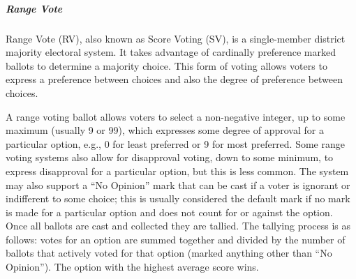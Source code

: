 %


\subparagraph{Range Vote}
Range Vote (RV), also known as Score Voting (SV), is a single-member district
majority electoral system. It takes advantage of cardinally preference marked
ballots to determine a majority choice. This form of voting allows voters to
express a preference between choices and also the degree of preference between
choices.

A range voting ballot allows voters to select a non-negative integer, up to some
maximum (usually 9 or 99), which expresses some degree of approval for a
particular option, e.g., 0 for least preferred or 9 for most preferred. Some
range voting systems also allow for disapproval voting, down to some minimum, to
express disapproval for a particular option, but this is less common. The system
may also support a ``No Opinion'' mark that can be cast if a voter is ignorant
or indifferent to some choice; this is usually considered the default mark if no
mark is made for a particular option and does not count for or against the
option. Once all ballots are cast and collected they are tallied. The tallying
process is as follows: votes for an option are summed together and divided by
the number of ballots that actively voted for that option (marked anything other
than ``No Opinion''). The option with the highest average score wins.

